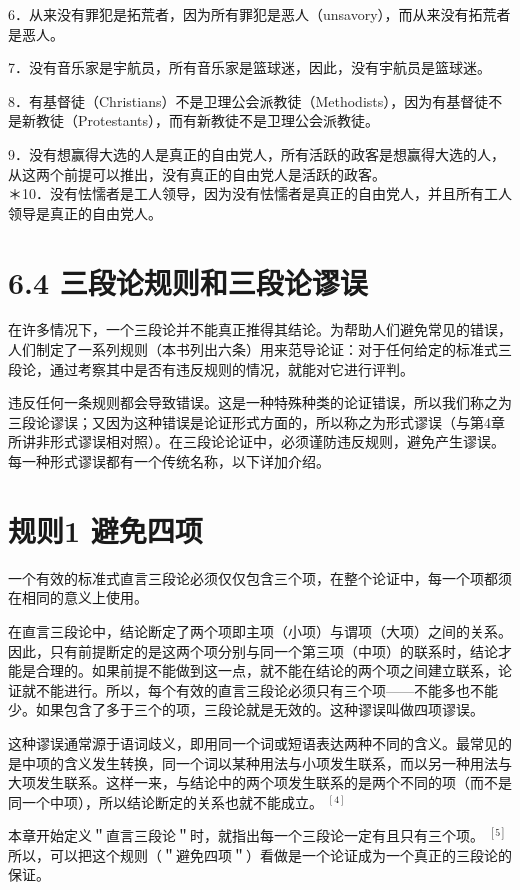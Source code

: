 6．从来没有罪犯是拓荒者，因为所有罪犯是恶人（unsavory），而从来没有拓荒者是恶人。

7．没有音乐家是宇航员，所有音乐家是篮球迷，因此，没有宇航员是篮球迷。

8．有基督徒（Christians）不是卫理公会派教徒（Methodists），因为有基督徒不是新教徒（Protestants），而有新教徒不是卫理公会派教徒。

9．没有想赢得大选的人是真正的自由党人，所有活跃的政客是想赢得大选的人，从这两个前提可以推出，没有真正的自由党人是活跃的政客。\\
＊10．没有怯懦者是工人领导，因为没有怯懦者是真正的自由党人，并且所有工人领导是真正的自由党人。

\section*{6.4 三段论规则和三段论谬误}
在许多情况下，一个三段论并不能真正推得其结论。为帮助人们避免常见的错误，人们制定了一系列规则（本书列出六条）用来范导论证：对于任何给定的标准式三段论，通过考察其中是否有违反规则的情况，就能对它进行评判。

违反任何一条规则都会导致错误。这是一种特殊种类的论证错误，所以我们称之为三段论谬误；又因为这种错误是论证形式方面的，所以称之为形式谬误（与第4章所讲非形式谬误相对照）。在三段论论证中，必须谨防违反规则，避免产生谬误。每一种形式谬误都有一个传统名称，以下详加介绍。

\section*{规则1 避免四项}
一个有效的标准式直言三段论必须仅仅包含三个项，在整个论证中，每一个项都须在相同的意义上使用。

在直言三段论中，结论断定了两个项即主项（小项）与谓项（大项）之间的关系。因此，只有前提断定的是这两个项分别与同一个第三项（中项）的联系时，结论才能是合理的。如果前提不能做到这一点，就不能在结论的两个项之间建立联系，论证就不能进行。所以，每个有效的直言三段论必须只有三个项——不能多也不能少。如果包含了多于三个的项，三段论就是无效的。这种谬误叫做四项谬误。

这种谬误通常源于语词歧义，即用同一个词或短语表达两种不同的含义。最常见的是中项的含义发生转换，同一个词以某种用法与小项发生联系，而以另一种用法与大项发生联系。这样一来，与结论中的两个项发生联系的是两个不同的项（而不是同一个中项），所以结论断定的关系也就不能成立。 ${ }^{[4]}$

本章开始定义＂直言三段论＂时，就指出每一个三段论一定有且只有三个项。 ${ }^{[5]}$ 所以，可以把这个规则（＂避免四项＂）看做是一个论证成为一个真正的三段论的保证。


